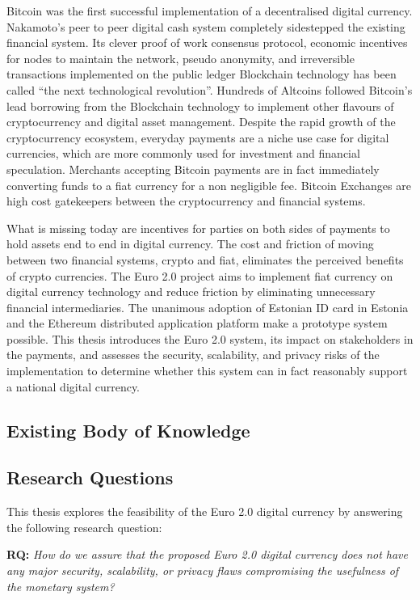 \documentclass[12pt]{article} %
\begin{document}
Bitcoin was the first successful implementation of a decentralised digital currency. Nakamoto's peer to peer digital cash system completely sidestepped the existing financial system\cite{nakamoto2008bitcoin}. Its clever proof of work consensus protocol, economic incentives for nodes to maintain the network, pseudo anonymity, and irreversible transactions implemented on the public ledger Blockchain technology has been called ``the next technological revolution''. Hundreds of Altcoins followed Bitcoin's lead borrowing from the Blockchain technology to implement other flavours of cryptocurrency and digital asset management. Despite the rapid growth of the cryptocurrency ecosystem, everyday payments are a niche use case for digital currencies, which are more commonly used for investment and financial speculation\cite{Khairuddin:2016:EMB:2851581.2892500}. Merchants accepting Bitcoin payments are in fact immediately converting funds to a fiat currency for a non negligible fee. Bitcoin Exchanges are high cost gatekeepers between the cryptocurrency and financial systems.

What is missing today are incentives for parties on both sides of payments to hold assets end to end in digital currency. The cost and friction of moving between two financial systems, crypto and fiat, eliminates the perceived benefits of crypto currencies. The Euro 2.0 project aims to implement fiat currency on digital currency technology and reduce friction by eliminating unnecessary financial intermediaries. The unanimous adoption of Estonian ID card in Estonia and the Ethereum distributed application platform make a prototype system possible. This thesis introduces the Euro 2.0 system, its impact on stakeholders in the payments, and assesses the security, scalability, and privacy risks of the implementation to determine whether this system can in fact reasonably support a national digital currency.

\subsection{Existing Body of Knowledge} \label{ssec:1.1}


\subsection{Research Questions} \label{ssec:1.2}

This thesis explores the feasibility of the Euro 2.0 digital currency by answering the following research question:
\begin{quoting}
	\textbf{RQ: }\textit{How do we assure that the proposed Euro 2.0 digital currency does not have any major security, scalability, or privacy flaws compromising the usefulness of the monetary system?}
\end{quoting}
\end{document}

